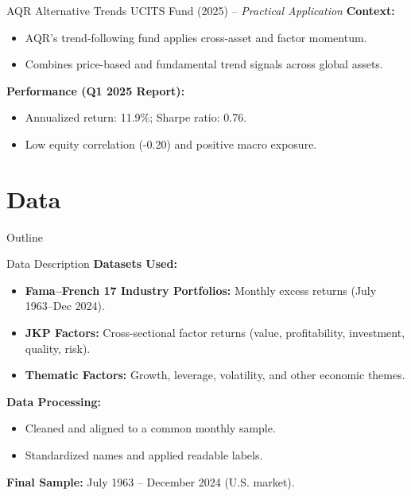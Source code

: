 \documentclass[t]{beamer}
\begin{document}
\begin{frame}{AQR Alternative Trends UCITS Fund (2025) -- \textit{Practical Application}}
\textbf{Context:}
\begin{itemize}
    \item AQR’s trend-following fund applies cross-asset and factor momentum.
    \item Combines price-based and fundamental trend signals across global assets.
\end{itemize}

\textbf{Performance (Q1 2025 Report):}
\begin{itemize}
    \item Annualized return: 11.9\%; Sharpe ratio: 0.76.
    \item Low equity correlation (-0.20) and positive macro exposure.
\end{itemize}
\end{frame}

\section{Data}

\begin{frame}{Outline}
\end{frame}

\begin{frame}{Data Description}
\textbf{Datasets Used:}
\begin{itemize}
    \item \textbf{Fama–French 17 Industry Portfolios:} Monthly excess returns (July 1963–Dec 2024).
    \item \textbf{JKP Factors:} Cross-sectional factor returns (value, profitability, investment, quality, risk).
    \item \textbf{Thematic Factors:} Growth, leverage, volatility, and other economic themes.
\end{itemize}

\textbf{Data Processing:}
\begin{itemize}
    \item Cleaned and aligned to a common monthly sample.
    \item Standardized names and applied readable labels.
\end{itemize}

\textbf{Final Sample:} July 1963 – December 2024 (U.S. market).
\end{frame}
\end{document}
